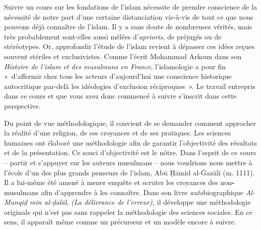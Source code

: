 Suivre un cours sur les fondations de l'islam nécessite de prendre
conscience de la nécessité de notre part d'une certaine distanciation
vis-à-vis de tout ce que nous pouvons déjà connaître de l'islam. Il y a
sans doute de nombreuses vérités, mais très probablement sont-elles
aussi mêlées d'\emph{aprioris}, de préjugés ou de stéréotypes. Or,
approfondir l'étude de l'islam revient à dépasser ces idées reçues
souvent stériles et exclusivistes. Comme l'écrit Mohammad Arkoun dans
son \emph{Histoire de l'islam et des musulmans en France}, l'islamologie
a pour fin «~d'affermir chez tous les acteurs d'aujourd'hui une
conscience historique autocritique par-delà les idéologies d'exclusion
réciproques~».
Le travail entrepris dans ce cours et que vous avez donc commencé à
suivre s'inscrit dans cette perspective.

Du point de vue méthodologique, il convient de se demander comment
approcher la réalité d'une religion, de ses croyances et de ses
pratiques. Les sciences humaines ont élaboré une méthodologie afin de
garantir l'objectivité des résultats et de la présentation. Ce souci
d'objectivité est le nôtre. Dans l'esprit de ce cours -- partir et
s'appuyer sur les auteurs musulmans -- nous voudrions nous mettre à
l'école d'un des plus grands penseurs de l'islam, Abū Ḥāmid al-Ġazālī
(m. 1111). Il a lui-même été amené à mener enquête et scruter les
croyances des non\textbf{-}musulmans afin d'apprendre à les connaître.
Dans son livre \emph{auto}biographique \emph{Al-Munqiḏ min al-ḍalāl},
\emph{(La délivrance de l'erreur),} il développe une méthodologie
originale qui n'est pas sans rappeler la méthodologie des sciences
sociales. En ce sens, il apparaît même comme un précurseur et un modèle
encore à suivre.

